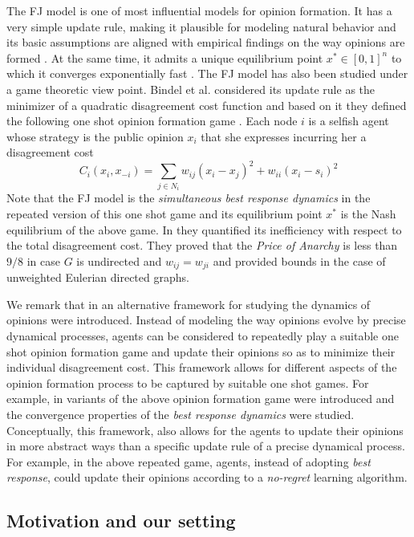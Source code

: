 The FJ model is one of most influential models for opinion formation. It has
a very simple update rule, making it plausible for modeling natural behavior
and its basic assumptions are aligned with empirical findings on the way
opinions are formed \cite{AFH05,K47}.  At the same time, it admits a unique
equilibrium point $x^* \in [0,1]^n$ to which it converges exponentially fast
\cite{GS14}.  The FJ model has also been studied under a game theoretic view
point.  Bindel et al. considered its update rule as the minimizer of a
quadratic disagreement cost function and based on it they defined the following
one shot opinion formation game \cite{BKO11}. Each node $i$ is a selfish agent
whose strategy is the public opinion $x_i$ that she expresses incurring her a
disagreement cost
%
\begin{equation}\label{eq:BKO_cost}
  C_i(x_i,x_{-i})= \sum_{j \in N_i}w_{ij} (x_i-x_j)^2 + w_{ii}(x_i-s_i)^2
\end{equation}
%
Note that the FJ model is the \emph{simultaneous best response dynamics} in the
repeated version of this one shot game and its equilibrium point $x^*$ is the
Nash equilibrium of the above game. 
In \cite{BKO11} they quantified its inefficiency with respect to the 
total disagreement cost. They proved that the \emph{Price of Anarchy} is less 
than $9/8$ in case $G$ is undirected and $w_{ij}=w_{ji}$ and
provided bounds in the case of unweighted Eulerian directed graphs.

We remark that in \cite{BKO11} an alternative framework for studying
the dynamics of opinions were introduced. Instead of
modeling the way opinions evolve by precise dynamical processes, agents can be
considered to repeatedly play a suitable one shot opinion formation game and
update their opinions so as to minimize their individual disagreement cost.
This framework allows for different aspects of the opinion formation process to
be captured by suitable one shot games.  For example, in \cite{BGM13,BFM16,EFHS17}
variants of the above opinion formation game were introduced and the
convergence properties of the \emph{best response dynamics} were studied.
Conceptually, this framework, also allows for the agents to update their
opinions in more abstract ways than a specific update rule of a precise
dynamical process.  For example, in the above repeated game, agents, instead of
adopting \emph{best response}, could update their opinions according to a
\emph{no-regret} learning algorithm.

\subsection{Motivation and our setting}

